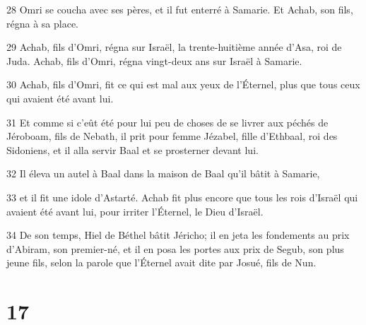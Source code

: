 \par 28 Omri se coucha avec ses pères, et il fut enterré à Samarie. Et Achab, son fils, régna à sa place.
\par 29 Achab, fils d'Omri, régna sur Israël, la trente-huitième année d'Asa, roi de Juda. Achab, fils d'Omri, régna vingt-deux ans sur Israël à Samarie.
\par 30 Achab, fils d'Omri, fit ce qui est mal aux yeux de l'Éternel, plus que tous ceux qui avaient été avant lui.
\par 31 Et comme si c'eût été pour lui peu de choses de se livrer aux péchés de Jéroboam, fils de Nebath, il prit pour femme Jézabel, fille d'Ethbaal, roi des Sidoniens, et il alla servir Baal et se prosterner devant lui.
\par 32 Il éleva un autel à Baal dans la maison de Baal qu'il bâtit à Samarie,
\par 33 et il fit une idole d'Astarté. Achab fit plus encore que tous les rois d'Israël qui avaient été avant lui, pour irriter l'Éternel, le Dieu d'Israël.
\par 34 De son temps, Hiel de Béthel bâtit Jéricho; il en jeta les fondements au prix d'Abiram, son premier-né, et il en posa les portes aux prix de Segub, son plus jeune fils, selon la parole que l'Éternel avait dite par Josué, fils de Nun.

\chapter{17}


